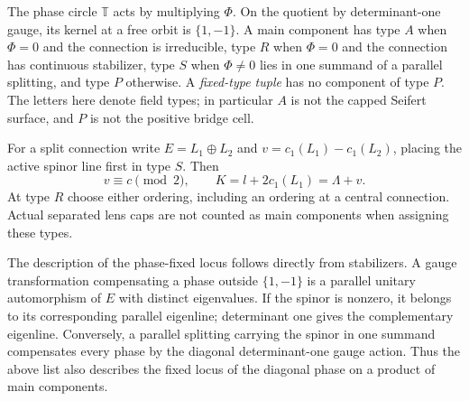 \begin{definition}\label{def:indices:types}
The phase circle $\mathbb T$ acts by multiplying $\Phi$.  On the quotient by
determinant-one gauge, its kernel at a free orbit is $\{1,-1\}$.  A main
component has type $A$ when $\Phi=0$ and the connection is irreducible, type
$R$ when $\Phi=0$ and the connection has continuous stabilizer, type $S$ when
$\Phi\ne0$ lies in one summand of a parallel splitting, and type $P$
otherwise.  A \emph{fixed-type tuple} has no component of type $P$.
The letters here denote field types; in particular $A$ is not the capped
Seifert surface, and $P$ is not the positive bridge cell.

For a split connection write $E=L_1\oplus L_2$ and
$v=c_1(L_1)-c_1(L_2)$, placing the active spinor line first in type $S$.
Then
\begin{equation}\label{eq:indices:split-classes}
 v\equiv c\pmod2,\qquad K=l+2c_1(L_1)=\Lambda+v.
\end{equation}
At type $R$ choose either ordering, including an ordering at a central
connection.  Actual separated lens caps are not counted as main components
when assigning these types.
\end{definition}

The description of the phase-fixed locus follows directly from stabilizers.
A gauge transformation compensating a phase outside $\{1,-1\}$ is a
parallel unitary automorphism of $E$ with distinct eigenvalues.  If the
spinor is nonzero, it belongs to its corresponding parallel eigenline;
determinant one gives the complementary eigenline.  Conversely,
a parallel splitting carrying the spinor in one summand compensates every
phase by the diagonal determinant-one gauge action.  Thus the above list
also describes the fixed locus of the diagonal phase on a product of main
components.

